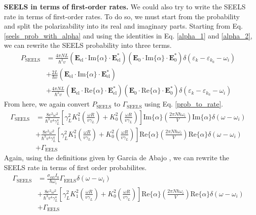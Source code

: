\documentclass [11pt, proquest] {uwthesis}[2016/11/22]
\begin{document}
{\bf SEELS in terms of first-order rates.} We could also try to write the SEELS rate in terms of first-order rates. To do so, we must start from the probability and split the polarizability into its real and imaginary parts. Starting from Eq. \ref{seels_prob_with_alpha} and using the identities in Eq. \ref{alpha_1} and \ref{alpha_2}, we can rewrite the SEELS probability into three terms.
\begin{equation}
\begin{split}
  P_{\textrm{SEELS}} &= \frac{4\pi NL}{\hbar^2v}(\textbf{E}_{\textrm{el}}\cdot\textrm{Im}\{\alpha\}\cdot\textbf{E}_{\textrm{el}}^*)(\textbf{E}_0\cdot\textrm{Im}\{\alpha\}\cdot\textbf{E}_0^*)\delta(\varepsilon_k - \varepsilon_{k_0}-\omega_i)\\
  &+ \frac{2L}{\hbar v}(\textbf{E}_{\textrm{el}}\cdot\textrm{Im}\{\alpha\}\cdot\textbf{E}_{\textrm{el}}^*)\\
  &+ \frac{4\pi NL}{\hbar^2v}(\textbf{E}_{\textrm{el}}\cdot\textrm{Re}\{\alpha\}\cdot\textbf{E}_{\textrm{el}}^*)(\textbf{E}_0\cdot\textrm{Re}\{\alpha\}\cdot\textbf{E}_0^*)\delta(\varepsilon_k - \varepsilon_{k_0}-\omega_i)
  \label{seels_prob_with_alpha}
  \end{split}
\end{equation}
From here, we again convert $P_{\textrm{SEELS}}$ to $\Gamma_{\textrm{SEELS}}$ using Eq. \ref{prob_to_rate}.
\begin{equation}
\begin{split}
  \Gamma_{\textrm{SEELS}} &= \frac{8 e^2 \omega^2}{\hbar^3v^4\gamma_L^4}\left[\gamma_{L}^2K_1^2\left(\frac{\omega R}{v\gamma_L}\right)+K_0^2\left(\frac{\omega R}{v\gamma_L}\right)\right]\textrm{Im}\{\alpha\}\left(\frac{2\pi N\hbar\omega_i}{V}\right)\textrm{Im}\{\alpha\}\delta(\omega-\omega_i)\\
  &+ \frac{8 e^2 \omega^2}{\hbar^3v^4\gamma_L^4}\left[\gamma_{L}^2K_1^2\left(\frac{\omega R}{v\gamma_L}\right)+K_0^2\left(\frac{\omega R}{v\gamma_L}\right)\right]\textrm{Re}\{\alpha\}\left(\frac{2\pi N\hbar\omega_i}{V}\right)\textrm{Re}\{\alpha\}\delta(\omega-\omega_i)\\
  &+ \Gamma_{\textrm{EELS}}
  \label{seels_rate_split}
  \end{split}
\end{equation}
Again, using the definitions given by Garcia de Abajo \cite{EEGS}, we can rewrite the SEELS rate in terms of first order probabilites.
\begin{equation}
\begin{split}
  \Gamma_{\textrm{SEELS}} &= \frac{\sigma_{\textrm{ext}}I_0}{\hbar\omega_i}\Gamma_{\textrm{EELS}}\delta(\omega-\omega_i)\\
  &+ \frac{8 e^2 \omega^2}{\hbar^3v^4\gamma_L^4}\left[\gamma_{L}^2K_1^2\left(\frac{\omega R}{v\gamma_L}\right)+K_0^2\left(\frac{\omega R}{v\gamma_L}\right)\right]\textrm{Re}\{\alpha\}\left(\frac{2\pi N\hbar\omega_i}{V}\right)\textrm{Re}\{\alpha\}\delta(\omega-\omega_i)\\
  &+ \Gamma_{\textrm{EELS}}
  \label{seels_rate_first}
  \end{split}
\end{equation}
\end{document}
